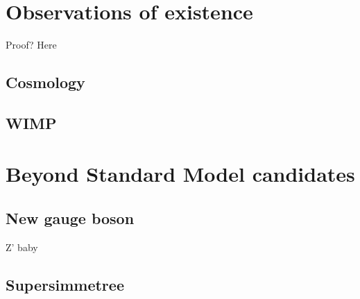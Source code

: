 \documentclass[12pt, a4paper]{book}
\begin{document}
\section{Observations of existence}
Proof? Here \cite{DM1, DM2}
\subsection{Cosmology}
\subsection{WIMP}

\section{Beyond Standard Model candidates}
\subsection{New gauge boson}
Z' baby \cite{Zp_DM_candidate1, Zp_DM_candidate2, Zp_DM_candidate3}
\subsection{Supersimmetree}
\end{document}
